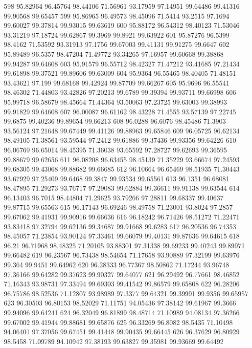 598	95.82964	96.45764	98.44106	71.56961	93.17959	97.14951	99.64486	99.41316	99.90568	99.65457
599	95.86965	96.49573	98.45096	71.5414	93.2515	97.1694	99.60027	99.37814	99.93015	99.63619
600	95.88172	96.54312	98.40123	71.53046	93.31219	97.18724	99.62867	99.3969	99.8921	99.63922
601	95.87276	96.5399	98.4162	71.53592	93.31913	97.1756	99.67003	99.41131	99.91275	99.6647
602	95.89489	96.5357	98.47204	71.49772	93.34265	97.16957	99.60668	99.38868	99.94287	99.64608
603	95.91579	96.55712	98.42327	71.47212	93.41685	97.21434	99.61898	99.37521	99.89606	99.63009
604	95.9364	96.55465	98.40405	71.48151	93.43621	97.199	99.68168	99.42924	99.87709	99.66267
605	95.9696	96.55541	98.46302	71.44803	93.42826	97.20213	99.6789	99.39394	99.93711	99.66998
606	95.99718	96.58679	98.45664	71.44364	93.50063	97.23725	99.63003	99.38993	99.91829	99.64608
607	96.00087	96.61162	98.43228	71.4555	93.57139	97.22745	99.6875	99.40236	99.89654	99.66213
608	96.0288	96.6076	98.45486	71.3903	93.56124	97.21648	99.67449	99.41126	99.88963	99.65846
609	96.05725	96.62134	98.49105	71.38561	93.59544	97.2412	99.61886	99.37436	99.93356	99.64226
610	96.06769	96.65014	98.45395	71.36038	93.65592	97.28727	99.62693	99.36595	99.88679	99.62656
611	96.08208	96.63455	98.45139	71.35229	93.66674	97.24593	99.68305	99.43068	99.88682	99.66685
612	96.10664	96.65469	98.51935	71.30443	93.67929	97.25409	99.6468	99.3847	99.93534	99.65561
613	96.1351	96.68081	98.47895	71.29273	93.76717	97.29083	99.62884	99.36611	99.91138	99.63544
614	96.13403	96.7015	98.44804	71.29625	93.79266	97.28811	99.68337	99.40637	99.87715	99.65563
615	96.17143	96.69246	98.49758	71.23001	93.8024	97.2857	99.67062	99.41931	99.90916	99.66636
616	96.18242	96.71426	98.51272	71.22471	93.83418	97.32794	99.62136	99.34687	99.91668	99.6283
617	96.20536	96.74353	98.45057	71.23854	93.90124	97.33461	99.66079	99.40131	99.87636	99.64615
618	96.21	96.71968	98.48325	71.20105	93.88301	97.31338	99.69233	99.40243	99.89971	99.66482
619	96.23567	96.73438	98.54654	71.17658	93.90889	97.32199	99.63976	99.364	99.9451	99.64962
620	96.28333	96.77367	98.50862	71.17244	93.96748	97.36166	99.64282	99.37623	99.90327	99.64077
621	96.29492	96.77661	98.46852	71.16343	93.98731	97.33494	99.69303	99.41542	99.86579	99.65808
622	96.28206	96.75786	98.52536	71.12807	93.98989	97.3377	99.64321	99.39991	99.9356	99.65957
623	96.30503	96.80153	98.52029	71.11751	94.05436	97.38142	99.61967	99.3666	99.94096	99.64241
624	96.32049	96.81899	98.48714	71.10989	94.08134	97.36266	99.67002	99.41944	99.88681	99.65876
625	96.33269	96.8082	98.5435	71.10498	94.06401	97.37056	99.67451	99.41448	99.90435	99.66445
626	96.37629	96.80929	98.5458	71.09789	94.10942	97.38193	99.63827	99.35981	99.93669	99.64492
